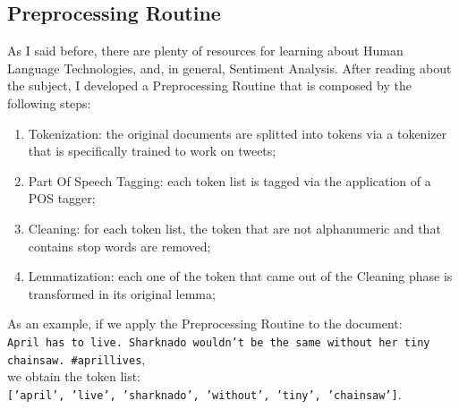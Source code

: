 \documentclass[11pt,twocolumn]{article}
\begin{document}
        \subsection{Preprocessing Routine} %
        \label{sub:preprocessing_routine}
            As I said before, there are plenty of resources for learning about Human Language Technologies, and,
            in general, Sentiment Analysis. After reading about the subject, I developed a Preprocessing
            Routine that is composed by the following steps:

            \begin{enumerate}
                \item Tokenization: the original documents are splitted into tokens via a tokenizer that is
                specifically trained to work on tweets;
                \item Part Of Speech Tagging: each token list is tagged via the application of a POS tagger;
                \item Cleaning: for each token list, the token that are not alphanumeric and that contains
                stop words are removed;
                \item Lemmatization: each one of the token that came out of the Cleaning phase is transformed
                in its original lemma;
            \end{enumerate}

            \noindent
            As an example, if we apply the Preprocessing Routine to the document:\\

            \noindent
            \texttt{April has to live. Sharknado wouldn't be the same without her tiny chainsaw. \#aprillives},
            \\

            \noindent
            we obtain the token list: \\

            \noindent
            \texttt{['april', 'live', 'sharknado', 'without', 'tiny', 'chainsaw']}.
\end{document}
